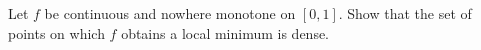Let \(f\) be continuous and nowhere monotone on \([0,1]\). Show that the set of points on which \(f\) obtains a local minimum is dense.
